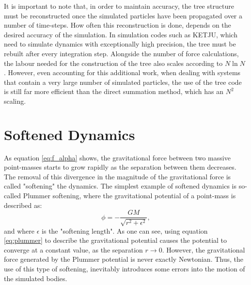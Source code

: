 \documentclass[english, twoside]{HYgradu}
\begin{document}
It is important to note that, in order to maintain accuracy, the tree structure must be reconstructed once the simulated particles have been propagated over a number of time-steps. How often this reconstruction is done, depends on the desired accuracy of the simulation. In simulation codes such as KETJU, which need to simulate dynamics with exceptionally high precision, the tree must be rebuilt after every integration step. Alongside the number of force calculations, the labour needed for the construction of the tree also scales according to $N \ln N$ \citep{BinneyTremaine}. However, even accounting for this additional work, when dealing with systems that contain a very large number of simulated particles, the use of the tree code is still far more efficient than the direct summation method, which has an $N^2$ scaling.

\section{Softened Dynamics} \label{section:softened_dynamics}

As equation \ref{eq:f_alpha} shows, the gravitational force between two massive point-masses starts to grow rapidly as the separation between them decreases. The removal of this divergence in the magnitude of the gravitational force is called "softening" the dynamics. The simplest example of softened dynamics is so-called Plummer softening, where the gravitational potential of a point-mass is described as:
\begin{equation}
\phi = -\frac{GM}{\sqrt{r^2 + \epsilon^2}}, \label{eq:plummer}
\end{equation}
and where $\epsilon$ is the "softening length". As one can see, using equation \ref{eq:plummer} to describe the gravitational potential causes the potential to converge at a constant value, as the separation $r \rightarrow 0$. However, the gravitational force generated by the Plummer potential is never exactly Newtonian. Thus, the use of this type of softening, inevitably introduces some errors into the motion of the simulated bodies.
\end{document}
